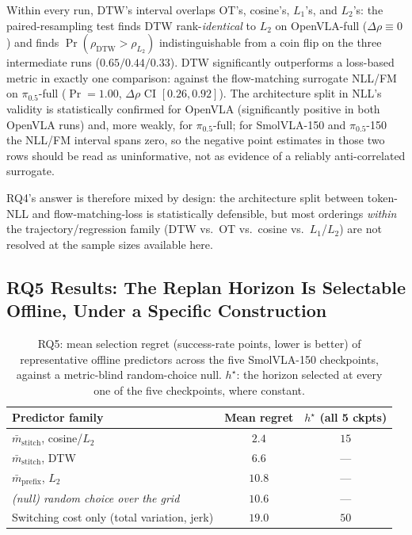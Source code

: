 \documentclass[english,12pt,a4paper,pdftex,elec,utf8]{aaltothesis}
\begin{document}
Within every run, DTW's interval overlaps OT's, cosine's, $L_1$'s, and $L_2$'s: the paired-resampling test finds DTW rank-\emph{identical} to $L_2$ on OpenVLA-full ($\Delta\rho\equiv0$) and finds $\Pr(\rho_{\mathrm{DTW}}>\rho_{L_2})$ indistinguishable from a coin flip on the three intermediate runs ($0.65/0.44/0.33$). DTW significantly outperforms a loss-based metric in exactly one comparison: against the flow-matching surrogate NLL/FM on $\pi_{0.5}$-full ($\Pr=1.00$, $\Delta\rho$ CI $[0.26,0.92]$). The architecture split in NLL's validity is statistically confirmed for OpenVLA (significantly positive in both OpenVLA runs) and, more weakly, for $\pi_{0.5}$-full; for SmolVLA-150 and $\pi_{0.5}$-150 the NLL/FM interval spans zero, so the negative point estimates in those two rows should be read as uninformative, not as evidence of a reliably anti-correlated surrogate.

RQ4's answer is therefore mixed by design: the architecture split between token-NLL and flow-matching-loss is statistically defensible, but most orderings \emph{within} the trajectory/regression family (DTW vs.\ OT vs.\ cosine vs.\ $L_1$/$L_2$) are not resolved at the sample sizes available here.

\subsection{RQ5 Results: The Replan Horizon Is Selectable Offline, Under a Specific Construction}
\label{sec:results-rq5}

\begin{table}[h]
\centering
\caption{RQ5: mean selection regret (success-rate points, lower is better) of representative offline predictors across the five SmolVLA-150 checkpoints, against a metric-blind random-choice null. $h^\star$: the horizon selected at every one of the five checkpoints, where constant.}
\label{tab:replan}
\begin{tabular}{lcc}
\toprule
Predictor family & Mean regret & $h^\star$ (all 5 ckpts) \\
\midrule
$\bar m_{\mathrm{stitch}}$, cosine/$L_2$ & $2.4$ & $15$ \\
$\bar m_{\mathrm{stitch}}$, DTW & $6.6$ & --- \\
$\bar m_{\mathrm{prefix}}$, $L_2$ & $10.8$ & --- \\
\emph{(null) random choice over the grid} & $10.6$ & --- \\
Switching cost only (total variation, jerk) & $19.0$ & $50$ \\
\bottomrule
\end{tabular}
\end{table}
\end{document}
